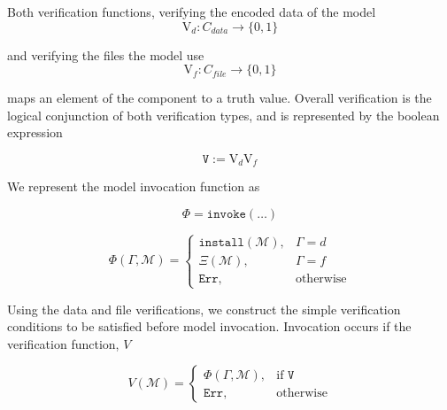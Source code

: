 \documentclass[10pt, titlepage, twocolumn]{report}
\begin{document}
Both verification functions, verifying the encoded data of the model
\begin{equation}
\text{V}_d : C _{data} \rightarrow \{0,1\}  
\end{equation}

and verifying the files the model use
\begin{equation}
\text{V}_f : C_{file} \rightarrow \{0,1\}  
\end{equation}

maps an element of the component to a truth value. Overall verification is the logical conjunction of both verification types, and is represented by the boolean expression

\begin{equation}
\texttt{V} := \text{V}_d\text{V}_f
\end{equation}

We represent the model invocation function as

\begin{equation}
\Phi = \texttt{invoke}(\dots)
\end{equation}



\begin{equation}
    \Phi( \Gamma,  \boldsymbol{\mathcal{M}} ) = 
\begin{cases}

    \texttt{install}( \boldsymbol{\mathcal{M}} ),		   
    & \Gamma = d\\
    
    \Xi ( \boldsymbol{\mathcal{M}} ),		   
    & \Gamma = f\\
    
    \texttt{Err},              							   
    & \text{otherwise}
    
\end{cases}
\end{equation}

Using the data and file verifications, we construct the simple verification conditions to be satisfied before model invocation. Invocation occurs if the verification function, \(V\)

\begin{equation}
    V( \boldsymbol{\mathcal{M}} ) = 
\begin{cases}

    \Phi( \Gamma, \boldsymbol{\mathcal{M}} ),		   
    & \text{if } \texttt{V}\\
    
    \texttt{Err},              							   
    & \text{otherwise}
    
\end{cases}
\end{equation}
\end{document}
